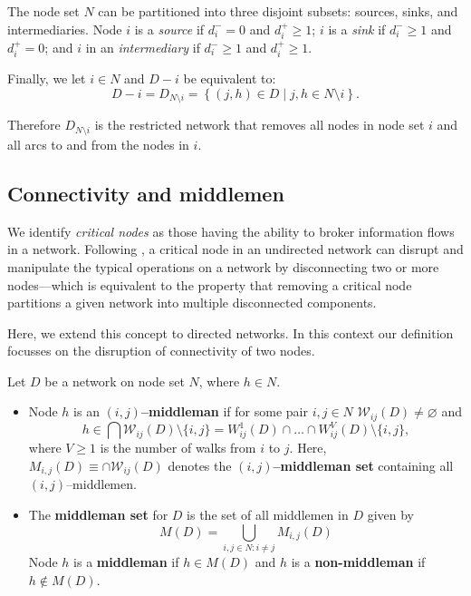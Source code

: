The node set $N$ can be partitioned into three disjoint subsets: sources, sinks, and intermediaries. Node $i$ is a \emph{source} if $d_{i}^{-} = 0$ and $d_{i}^{+} \geqslant 1$; $i$ is a \emph{sink} if $d_{i}^{-} \geqslant 1$ and $d_{i}^{+} = 0$; and $i$ in an \emph{intermediary} if $d_{i}^{-} \geqslant 1$ and $d_{i}^{+} \geqslant 1$.

Finally, we let $i \in N$ and $D-i$ be equivalent to:
\begin{equation}
D - i = D_{N \setminus i} = \left\{ (j,h) \in D \mid j,h \in N \setminus i \right\} .
\end{equation}

Therefore $D_{N \setminus i}$ is the restricted network that removes all nodes in node set $i$ and all arcs to and from the nodes in $i$.

\subsection{Connectivity and middlemen}

We identify \textit{critical nodes} as those having the ability to broker information flows in a network. Following \citet{GillesChakrabarti2006}, a critical node in an undirected network can disrupt and manipulate the typical operations on a network by disconnecting two or more nodes---which is equivalent to the property that removing a critical node partitions a given network into multiple disconnected components.

Here, we extend this concept to directed networks. In this context our definition focusses on the disruption of connectivity of two nodes.

\begin{definition}[Middleman] \label{middleman}
Let $D$ be a network on node set $N$, where $h \in N$.
\begin{itemize}
\item Node $h$ is an \textbf{$(i,j)$--middleman} if for some pair $i,j \in N$ $\mathcal{W}_{ij} (D) \neq \varnothing$ and
\begin{equation} \label{ijmiddleman}
h \in \bigcap \mathcal{W}_{ij}(D) \setminus \{i,j\} = W_{ij}^{1}(D) \cap  \ldots  \cap W_{ij}^{V}(D) \setminus \{i,j\},
\end{equation}
where $V \geqslant 1$ is the number of walks from $i$ to $j$. Here, $M_{i,j}(D) \equiv \cap \mathcal{W}_{ij}(D)$ denotes the \textbf{$(i,j)$--middleman set} containing all $(i,j)$--middlemen.

\item The \textbf{middleman set} for $D$ is the set of all middlemen in $D$ given by
\begin{equation} \label{middlemanseteq}
M(D) = \bigcup_{i,j \in N \colon i \neq j} M_{i,j}(D)
\end{equation}
Node $h$ is a \textbf{middleman} if $h \in M(D)$ and $h$ is a \textbf{non-middleman} if $h \notin M(D)$.
\end{itemize}
\end{definition}

